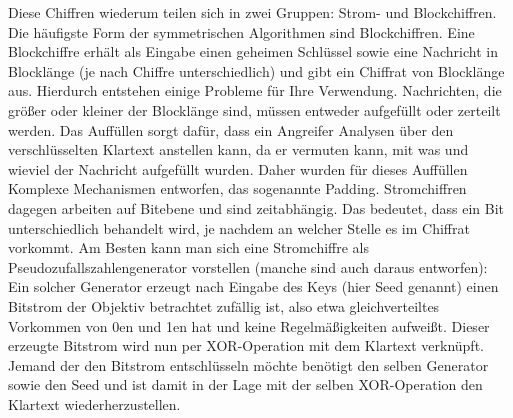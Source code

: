 \documentclass[13pt,a4paper,bibliography=totocnumbered,listof=totocnumbered]{scrartcl}
\begin{document}
Diese Chiffren wiederum teilen sich in zwei Gruppen: Strom- und Blockchiffren. Die häufigste Form der symmetrischen Algorithmen sind Blockchiffren. Eine Blockchiffre erhält als Eingabe einen geheimen Schlüssel sowie eine Nachricht in Blocklänge (je nach Chiffre unterschiedlich) und gibt ein Chiffrat von Blocklänge aus. Hierdurch entstehen einige Probleme für Ihre Verwendung. Nachrichten, die größer oder kleiner der Blocklänge sind, müssen entweder aufgefüllt oder zerteilt werden. Das Auffüllen sorgt dafür, dass ein Angreifer Analysen über den verschlüsselten Klartext anstellen kann, da er vermuten kann, mit was und wieviel der Nachricht aufgefüllt wurden. Daher wurden für dieses Auffüllen Komplexe Mechanismen entworfen, das sogenannte Padding. Stromchiffren dagegen arbeiten auf Bitebene und sind zeitabhängig. Das bedeutet, dass ein Bit unterschiedlich behandelt wird, je nachdem an welcher Stelle es im Chiffrat vorkommt. Am Besten kann man sich eine Stromchiffre als Pseudozufallszahlengenerator vorstellen (manche sind auch daraus entworfen): Ein solcher Generator erzeugt nach Eingabe des Keys (hier Seed genannt) einen Bitstrom der Objektiv betrachtet zufällig ist, also etwa gleichverteiltes Vorkommen von 0en und 1en hat und keine Regelmäßigkeiten aufweißt. Dieser erzeugte Bitstrom wird nun per XOR-Operation mit dem Klartext verknüpft. Jemand der den Bitstrom entschlüsseln möchte benötigt den selben Generator sowie den Seed und ist damit in der Lage mit der selben XOR-Operation den Klartext wiederherzustellen.\\
\cite[S. 4, 223, 249]{42}\\ 
\end{document}
